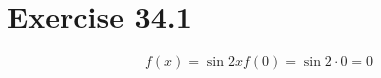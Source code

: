 \documentclass[a4paper, 10pt]{scrartcl}
\begin{document}
\section{Exercise 34.1}

\begin{displaymath}
f(x) = \sin{2x}
f(0) = \sin{2 \cdot 0} = 0
\end{displaymath}
\end{document}
